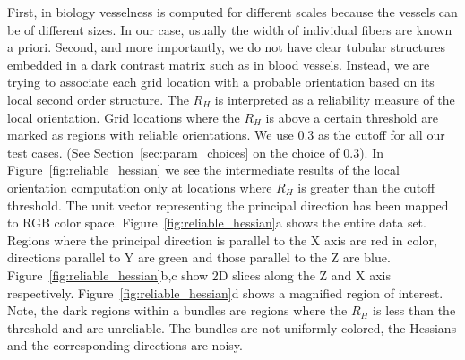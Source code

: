 First, in biology vesselness is computed for different scales because the vessels can be of different sizes. In our case, usually the width of individual fibers are known a priori.
Second, and more importantly, we do not have clear tubular structures embedded in a dark contrast matrix such as in blood vessels.
Instead, we are trying to associate each grid location  with a probable orientation based on its local second order structure. The $R_{H}$ is interpreted as a reliability measure of the local orientation.
Grid locations where the $R_{H}$ is above a certain threshold are marked as regions with reliable orientations.
We use 0.3 as the cutoff for all our test cases. (See Section~\ref{sec:param_choices} on the choice of 0.3).
In Figure~\ref{fig:reliable_hessian} we see the intermediate results of the local orientation computation only at locations where $R_{H}$ is greater than the cutoff threshold. The unit vector representing the principal direction has been mapped to RGB color space. Figure~\ref{fig:reliable_hessian}a shows the entire data set. Regions where the principal direction is parallel to the X axis are red in color, directions parallel to Y are green and those parallel to the Z are blue. Figure~\ref{fig:reliable_hessian}b,c show 2D slices along the Z and X axis respectively. Figure~\ref{fig:reliable_hessian}d shows a magnified region of interest. Note, the dark regions within a bundles are regions where the $R_H$ is less than the threshold and are unreliable. The bundles are not uniformly colored, the Hessians and the corresponding directions are noisy.

